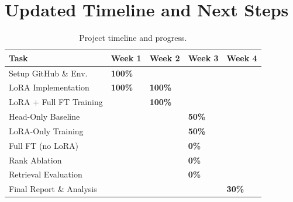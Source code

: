 \documentclass[11pt]{article}
\begin{document}
\section{Updated Timeline and Next Steps}

\begin{table}[H]
\small
\centering
\renewcommand\arraystretch{1.3}
\setlength{\tabcolsep}{5pt}
\begin{tabular}{|>{\centering\arraybackslash}m{3.5cm}|
                >{\centering\arraybackslash}m{2cm}|
                >{\centering\arraybackslash}m{2cm}|
                >{\centering\arraybackslash}m{2cm}|
                >{\centering\arraybackslash}m{2cm}|}
\hline
\rowcolor{gray!25}\textbf{Task} & \textbf{Week 1} & \textbf{Week 2} & \textbf{Week 3} & \textbf{Week 4} \\
\hline
Setup GitHub \& Env. & \cellcolor{green!30}\textbf{100\%} & & & \\
\hline
LoRA Implementation & \cellcolor{green!30}\textbf{100\%} & \cellcolor{green!30}\textbf{100\%} & & \\
\hline
LoRA + Full FT Training & & \cellcolor{green!30}\textbf{100\%} & & \\
\hline
Head-Only Baseline & & & \cellcolor{yellow!30}\textbf{50\%} & \\
\hline
LoRA-Only Training & & & \cellcolor{yellow!30}\textbf{50\%} & \\
\hline
Full FT (no LoRA) & & & \cellcolor{orange!30}\textbf{0\%} & \\
\hline
Rank Ablation & & & \cellcolor{orange!30}\textbf{0\%} & \\
\hline
Retrieval Evaluation & & & \cellcolor{orange!30}\textbf{0\%} & \\
\hline
Final Report \& Analysis & & & & \cellcolor{red!20}\textbf{30\%} \\
\hline
\end{tabular}
\caption{Project timeline and progress.}
\label{tab:timeline}
\end{table}
\end{document}
